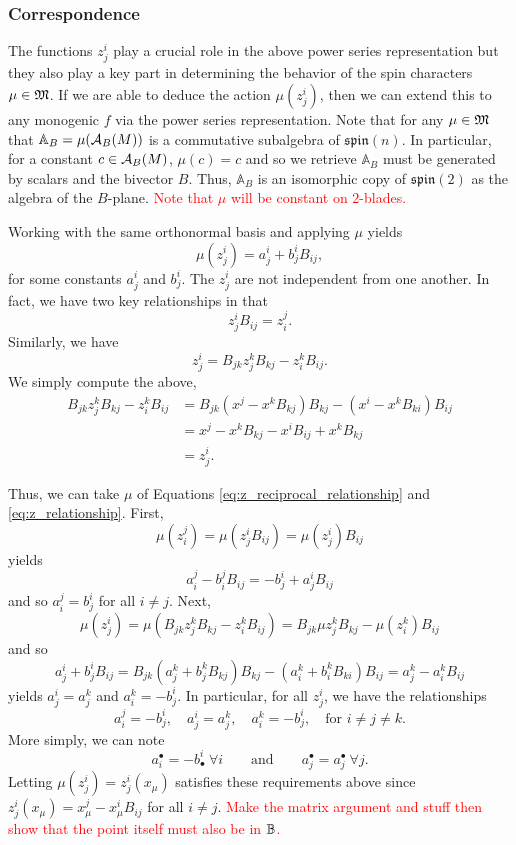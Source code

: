 \subsubsection{Correspondence}

The functions $z_j^i$ play a crucial role in the above power series representation but they also play a key part in determining the behavior of the spin characters $\mu \in \mathfrak{M}$.  If we are able to deduce the action $\mu(z_j^i)$, then we can extend this to any monogenic $f$ via the power series representation. Note that for any $\mu \in \mathfrak{M}$ that $\mathbb{A}_B=\mu(\mathcal{A}_{B}(M))$ is a commutative subalgebra of $\mathfrak{spin}(n)$.  In particular, for a constant $c \in \mathcal{A}_{B}(M)$, $\mu(c)=c$ and so we retrieve $\mathbb{A}_B$ must be generated by scalars and the bivector $B$.  Thus, $\mathbb{A}_B$ is an isomorphic copy of $\mathfrak{spin}(2)$ as the algebra of the $B$-plane. \textcolor{red}{Note that $\mu$ will be constant on $2$-blades.}

Working with the same orthonormal basis and applying $\mu$ yields
\[
\mu(z_j^i) = a_j^i + b_j^i B_{ij},
\]
for some constants $a_j^i$ and $b_j^i$.  The $z_j^i$ are not independent from one another.  In fact, we have two key relationships in that
\begin{equation}
\label{eq:z_reciprocal_relationship}
z_j^i B_{ij}  = z_i^j.
\end{equation}
Similarly, we have
\begin{equation}
\label{eq:z_relationship}
z_j^i = B_{jk} z_j^k B_{kj} - z_i^k B_{ij}.
\end{equation}
We simply compute the above,
\begin{align*}
B_{jk} z_j^k B_{kj} - z_i^k B_{ij} &= B_{jk} (x^j-x^k B_{kj}) B_{kj} - (x^i -x^k B_{ki}) B_{ij}\\
    &= x^j -x^k B_{kj} -x^i B_{ij} +x^k B_{kj}\\
    &= z_j^i.
\end{align*}

Thus, we can take $\mu$ of Equations \ref{eq:z_reciprocal_relationship} and \ref{eq:z_relationship}. First, 
\[
\mu(z_i^j) = \mu(z_j^i B_{ij}) = \mu(z_j^i) B_{ij}
\]
yields
\[
a_i^j - b_i^j B_{ij} = -b_j^i + a_j^i B_{ij}
\]
and so $a_i^j = b_j^i$ for all $i \neq j$. Next,
\[
\mu(z_j^i) = \mu(B_{jk} z_j^k B_{kj} - z_i^k B_{ij}) = B_{jk} \mu{z_j^k} B_{kj} - \mu(z_i^k) B_{ij}
\]
and so
\[
a_j^i + b_j^i B_{ij} = B_{jk} (a_j^k +b_j^k B_{kj}) B_{kj} - (a_i^k + b_i^k B_{ki}) B_{ij} = a_j^k - a_i^k B_{ij}
\]
yields $a_j^i = a_j^k$ and $a_i^k=-b_j^i$. In particular, for all $z_j^i$, we have the relationships
\[
a_i^j =- b_j^i, \quad a_j^i = a_j^k, \quad a_i^k =- b_j^i, \quad \textrm{for $i\neq j \neq k$.}
\]
More simply, we can note 
\[
a_i^\bullet = - b_\bullet^i ~\forall i \qquad \textrm{and} \qquad  a_j^\bullet = a_j^\bullet ~\forall j.
\]
Letting $\mu(z_j^i) = z_j^i(x_\mu)$ satisfies these requirements above since $z_j^i(x_\mu) = x_\mu^j - x_\mu^i B_{ij}$ for all $i\neq j$. 
\textcolor{red}{Make the matrix argument and stuff then show that the point itself must also be in $\mathbb{B}$.}




